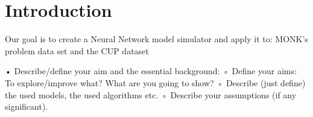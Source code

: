\section{Introduction}
Our goal is to create a Neural Network model simulator and apply it to: MONK's problem data set and the CUP dataset



• Describe/define  your aim and the essential  background: 
	◦ Define your aims: To explore/improve what? What are you going to show? 
	◦ Describe (just define) the used models, the used algorithms  etc. 
	◦ Describe your assumptions (if any significant).
